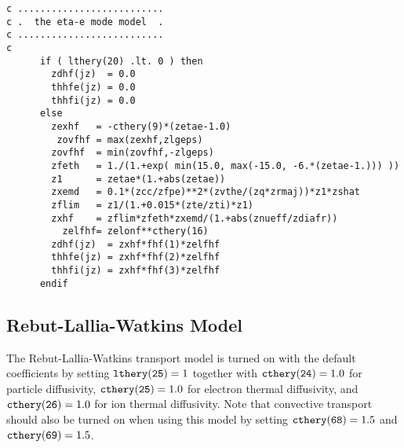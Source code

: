 \begin{verbatim}
c ..........................
c .  the eta-e mode model  .
c ..........................
c
      if ( lthery(20) .lt. 0 ) then
        zdhf(jz)  = 0.0
        thhfe(jz) = 0.0
        thhfi(jz) = 0.0
      else
        zexhf   = -cthery(9)*(zetae-1.0)
         zovfhf = max(zexhf,zlgeps)
        zovfhf  = min(zovfhf,-zlgeps)
        zfeth   = 1./(1.+exp( min(15.0, max(-15.0, -6.*(zetae-1.))) ))
        z1      = zetae*(1.+abs(zetae))
        zxemd   = 0.1*(zcc/zfpe)**2*(zvthe/(zq*zrmaj))*z1*zshat
        zflim   = z1/(1.+0.015*(zte/zti)*z1)
        zxhf    = zflim*zfeth*zxemd/(1.+abs(znueff/zdiafr))
          zelfhf= zelonf**cthery(16)
        zdhf(jz)  = zxhf*fhf(1)*zelfhf
        thhfe(jz) = zxhf*fhf(2)*zelfhf
        thhfi(jz) = zxhf*fhf(3)*zelfhf
      endif
\end{verbatim}


\subsection{Rebut-Lallia-Watkins Model}

The Rebut-Lallia-Watkins transport model\cite{RLW88a,rebu91a} 
is turned on with the default coefficients by setting
${\tt lthery(25)} = 1$ together with
${\tt cthery(24)} = 1.0$ for particle diffusivity, 
${\tt cthery(25)} = 1.0$ for electron thermal diffusivity, and
${\tt cthery(26)} = 1.0$ for ion thermal diffusivity.
Note that convective transport should also be turned on when using this
model by setting ${\tt cthery(68)} = 1.5$ and ${\tt cthery(69)} = 1.5$.

